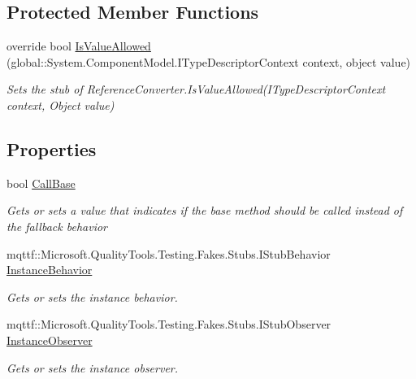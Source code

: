 \subsection*{Protected Member Functions}
\begin{DoxyCompactItemize}
\item 
override bool \hyperlink{class_system_1_1_component_model_1_1_fakes_1_1_stub_component_converter_a03a0fef6802a71e5f580a5fc1aaa16eb}{Is\-Value\-Allowed} (global\-::\-System.\-Component\-Model.\-I\-Type\-Descriptor\-Context context, object value)
\begin{DoxyCompactList}\small\item\em Sets the stub of Reference\-Converter.\-Is\-Value\-Allowed(\-I\-Type\-Descriptor\-Context context, Object value)\end{DoxyCompactList}\end{DoxyCompactItemize}
\subsection*{Properties}
\begin{DoxyCompactItemize}
\item 
bool \hyperlink{class_system_1_1_component_model_1_1_fakes_1_1_stub_component_converter_a132bfe4f2f8dab21d4052cb0171cd5fe}{Call\-Base}
\begin{DoxyCompactList}\small\item\em Gets or sets a value that indicates if the base method should be called instead of the fallback behavior\end{DoxyCompactList}\item 
mqttf\-::\-Microsoft.\-Quality\-Tools.\-Testing.\-Fakes.\-Stubs.\-I\-Stub\-Behavior \hyperlink{class_system_1_1_component_model_1_1_fakes_1_1_stub_component_converter_a145c9e95c3161464161dcef8f513112c}{Instance\-Behavior}
\begin{DoxyCompactList}\small\item\em Gets or sets the instance behavior.\end{DoxyCompactList}\item 
mqttf\-::\-Microsoft.\-Quality\-Tools.\-Testing.\-Fakes.\-Stubs.\-I\-Stub\-Observer \hyperlink{class_system_1_1_component_model_1_1_fakes_1_1_stub_component_converter_aaf601988e0c11f539d35ef64bed54a14}{Instance\-Observer}
\begin{DoxyCompactList}\small\item\em Gets or sets the instance observer.\end{DoxyCompactList}\end{DoxyCompactItemize}


